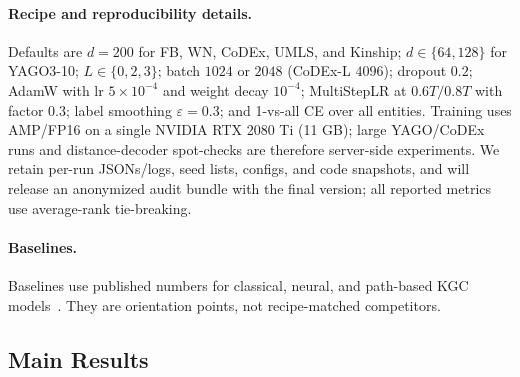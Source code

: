 \documentclass[runningheads]{llncs}
\begin{document}
\paragraph{Recipe and reproducibility details.}
Defaults are $d{=}200$ for FB, WN, CoDEx, UMLS, and Kinship; $d\in\{64,128\}$ for YAGO3-10; $L\in\{0,2,3\}$; batch $1024$ or $2048$ (CoDEx-L $4096$); dropout $0.2$; AdamW with lr $5{\times}10^{-4}$ and weight decay $10^{-4}$; MultiStepLR at $0.6T/0.8T$ with factor $0.3$; label smoothing $\varepsilon{=}0.3$; and 1-vs-all CE over all entities. Training uses AMP/FP16 on a single NVIDIA RTX 2080 Ti (11 GB); large YAGO/CoDEx runs and distance-decoder spot-checks are therefore server-side experiments. We retain per-run JSONs/logs, seed lists, configs, and code snapshots, and will release an anonymized audit bundle with the final version; all reported metrics use average-rank tie-breaking.

\paragraph{Baselines.}
Baselines use published numbers for classical, neural, and path-based KGC models~\cite{transe,distmult,complex,lacroix2018complex,rotate,compgcn,hake,nbfnet}. They are orientation points, not recipe-matched competitors.

\subsection{Main Results}
\label{sec:main}
\end{document}
